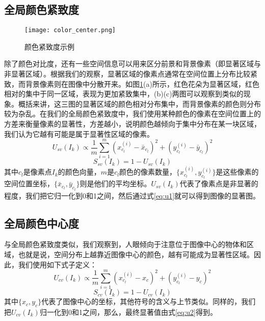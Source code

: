 \subsection{全局颜色紧致度}
\begin{figure}
\centering
\texttt{[image: color\_center.png]}
\caption{颜色紧致度示例}\label{fig:color_center}
\end{figure}
除了颜色对比度，还有一些空间信息可以用来区分前景和背景像素（即显著区域与非显著区域）。根据我们的观察，显著区域的像素点通常在空间位置上分布比较紧致，而背景像素则在图像中分散开来。如图\ref{fig:color_center}(a)所示，红色花朵为显著区域，红色相对的集中于同一区域，表现为更加紧致集中，(b)(c)两图可以观察到类似的现象。概括来讲，这三图的显著区域的颜色相对分布集中，而背景像素的颜色则分布较为杂乱。在我们的全局颜色紧致度中，我们使用某种颜色的像素在空间位置上的方差来衡量像素的显著性，方差越小，说明颜色越倾向于集中分布在某一块区域，我们认为它越有可能是属于显著性区域的像素。
\begin{equation}
  U_{sv}(I_k) \propto \frac{1}{m}\sum_{i=1}^{m}(x_{c_l}^{(i)} - \bar{x}_{c_l})^2 + (y_{c_l}^{(i)} - \bar{y}_{c_l})^2 \label{eq:u0}
\end{equation}
\begin{equation}
  S_{sv}(I_k) = 1 - U_{sv}(I_k) \label{eq:u1}
\end{equation}
其中$c_l$是像素点$I_k$的颜色向量，$m$是$c_l$颜色的像素数量，$\{x_{c_l}^{(i)},y_{c_l}^{(i)}\}$是这些像素的空间位置坐标，$\{\bar{x}_{c_l},\bar{y}_{c_l}\}$则是他们的平均坐标。$U_{sv}(I_k)$代表了像素点是非显著的程度，我们把它归一化到0和1之间，然后通过式\ref{eq:u1}就可以得到图像的显著图。

\subsection{全局颜色中心度}
与全局颜色紧致度类似，我们观察到，人眼倾向于注意位于图像中心的物体和区域，也就是说，空间分布上越靠近图像中心的颜色，越有可能成为显著性区域。因此，我们使用如下式子定义：
\begin{equation}
  U_{cv}(I_k) \propto \frac{1}{m}\sum_{i=1}^{m}(x_{c_l}^{(i)} - x_c)^2 + (y_{c_l}^{(i)} - y_c)^2
\end{equation}
\begin{equation}
  S_{cv}(I_k) = 1 - U_{cv}(I_k) \label{eq:u2}
\end{equation}
其中$\{x_c, y_c\}$代表了图像中心的坐标，其他符号的含义与上节类似。同样的，我们把$U_{cv}(I_k)$归一化到0和1之间，那么，最终显著值由式\ref{eq:u2}得到。

